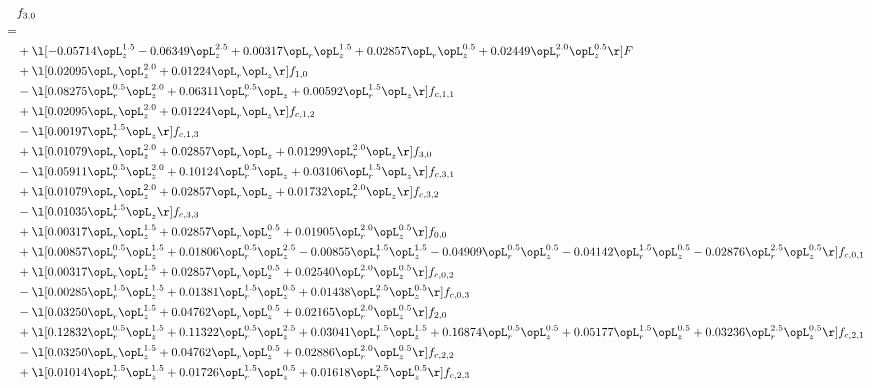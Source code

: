 \begin{alignat}{2} 
\label{eq:f_30_1} 
& f_{3,0} \nonumber \\ 
 = \\ 
& + \l[  -0.05714 \opL_z^{1.5}   -0.06349 \opL_z^{2.5} +  0.00317 \opL_r \opL_z^{1.5} +  0.02857 \opL_r \opL_z^{0.5} +  0.02449 \opL_r^{2.0} \opL_z^{0.5}  \r] F \nonumber \\ 
& + \l[  0.02095 \opL_r \opL_z^{2.0} +  0.01224 \opL_r \opL_z  \r] f_{1,0} \nonumber \\ 
& - \l[  0.08275 \opL_r^{0.5} \opL_z^{2.0} +  0.06311 \opL_r^{0.5} \opL_z +  0.00592 \opL_r^{1.5} \opL_z  \r] f_{c,1,1} \nonumber \\ 
& + \l[  0.02095 \opL_r \opL_z^{2.0} +  0.01224 \opL_r \opL_z  \r] f_{c,1,2} \nonumber \\ 
& - \l[  0.00197 \opL_r^{1.5} \opL_z  \r] f_{c,1,3} \nonumber \\ 
& + \l[  0.01079 \opL_r \opL_z^{2.0} +  0.02857 \opL_r \opL_z +  0.01299 \opL_r^{2.0} \opL_z  \r] f_{3,0} \nonumber \\ 
& - \l[  0.05911 \opL_r^{0.5} \opL_z^{2.0} +  0.10124 \opL_r^{0.5} \opL_z +  0.03106 \opL_r^{1.5} \opL_z  \r] f_{c,3,1} \nonumber \\ 
& + \l[  0.01079 \opL_r \opL_z^{2.0} +  0.02857 \opL_r \opL_z +  0.01732 \opL_r^{2.0} \opL_z  \r] f_{c,3,2} \nonumber \\ 
& - \l[  0.01035 \opL_r^{1.5} \opL_z  \r] f_{c,3,3} \nonumber \\ 
& + \l[  0.00317 \opL_r \opL_z^{1.5} +  0.02857 \opL_r \opL_z^{0.5} +  0.01905 \opL_r^{2.0} \opL_z^{0.5}  \r] f_{0,0} \nonumber \\ 
& + \l[  0.00857 \opL_r^{0.5} \opL_z^{1.5} +  0.01806 \opL_r^{0.5} \opL_z^{2.5}   -0.00855 \opL_r^{1.5} \opL_z^{1.5}   -0.04909 \opL_r^{0.5} \opL_z^{0.5}   -0.04142 \opL_r^{1.5} \opL_z^{0.5}   -0.02876 \opL_r^{2.5} \opL_z^{0.5}  \r] f_{c,0,1} \nonumber \\ 
& + \l[  0.00317 \opL_r \opL_z^{1.5} +  0.02857 \opL_r \opL_z^{0.5} +  0.02540 \opL_r^{2.0} \opL_z^{0.5}  \r] f_{c,0,2} \nonumber \\ 
& - \l[  0.00285 \opL_r^{1.5} \opL_z^{1.5} +  0.01381 \opL_r^{1.5} \opL_z^{0.5} +  0.01438 \opL_r^{2.5} \opL_z^{0.5}  \r] f_{c,0,3} \nonumber \\ 
& - \l[  0.03250 \opL_r \opL_z^{1.5} +  0.04762 \opL_r \opL_z^{0.5} +  0.02165 \opL_r^{2.0} \opL_z^{0.5}  \r] f_{2,0} \nonumber \\ 
& + \l[  0.12832 \opL_r^{0.5} \opL_z^{1.5} +  0.11322 \opL_r^{0.5} \opL_z^{2.5} +  0.03041 \opL_r^{1.5} \opL_z^{1.5} +  0.16874 \opL_r^{0.5} \opL_z^{0.5} +  0.05177 \opL_r^{1.5} \opL_z^{0.5} +  0.03236 \opL_r^{2.5} \opL_z^{0.5}  \r] f_{c,2,1} \nonumber \\ 
& - \l[  0.03250 \opL_r \opL_z^{1.5} +  0.04762 \opL_r \opL_z^{0.5} +  0.02886 \opL_r^{2.0} \opL_z^{0.5}  \r] f_{c,2,2} \nonumber \\ 
& + \l[  0.01014 \opL_r^{1.5} \opL_z^{1.5} +  0.01726 \opL_r^{1.5} \opL_z^{0.5} +  0.01618 \opL_r^{2.5} \opL_z^{0.5}  \r] f_{c,2,3} \nonumber \\ 
\end{alignat} 


